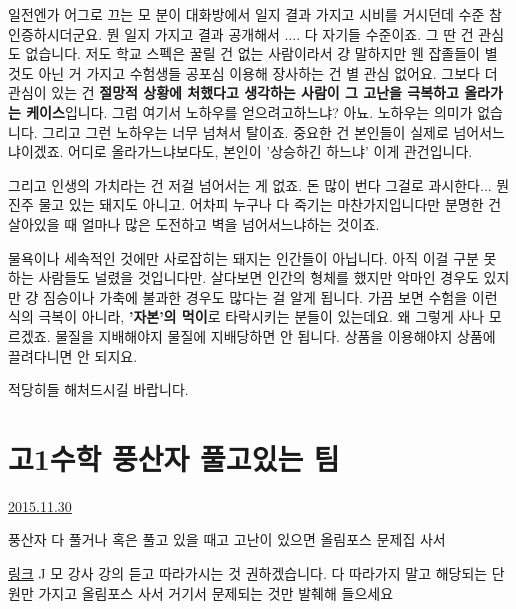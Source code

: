 일전엔가 어그로 끄는 모 분이 대화방에서 일지 결과 가지고 시비를 거시던데 수준 참 인증하시더군요.
뭔 일지 가지고 결과 공개해서 .... 다 자기들 수준이죠. 그 딴 건 관심도 없습니다.
저도 학교 스펙은 꿀릴 건 없는 사람이라서 걍 말하지만 웬 잡졸들이 별 것도 아닌 거 가지고 수험생들 공포심 이용해 장사하는 건 별 관심 없어요.
그보다 더 관심이 있는 건 \textbf{절망적 상황에 처했다고 생각하는 사람이 그 고난을 극복하고 올라가는 케이스}입니다.
그럼 여기서 노하우를 얻으려고하느냐? 아뇨. 노하우는 의미가 없습니다. 그리고 그런 노하우는 너무 넘쳐서 탈이죠.
중요한 건 본인들이 실제로 넘어서느냐이겠죠. 어디로 올라가느냐보다도, 본인이 '상승하긴 하느냐' 이게 관건입니다.
\vspace{5mm}

그리고 인생의 가치라는 건 저걸 넘어서는 게 없죠.
돈 많이 번다 그걸로 과시한다... 뭔 진주 물고 있는 돼지도 아니고.
어차피 누구나 다 죽기는 마찬가지입니다만 분명한 건 살아있을 때 얼마나 많은 도전하고 벽을 넘어서느냐하는 것이죠.
\vspace{5mm}

물욕이나 세속적인 것에만 사로잡히는 돼지는 인간들이 아닙니다. 아직 이걸 구분 못 하는 사람들도 널렸을 것입니다만.
살다보면 인간의 형체를 했지만 악마인 경우도 있지만 걍 짐승이나 가축에 불과한 경우도 많다는 걸 알게 됩니다.
가끔 보면 수험을 이런 식의 극복이 아니라, \textbf{'자본'의 먹이}로 타락시키는 분들이 있는데요.
왜 그렇게 사나 모르겠죠.
물질을 지배해야지 물질에 지배당하면 안 됩니다.
상품을 이용해야지 상품에 끌려다니면 안 되지요.
\vspace{5mm}

적당히들 해처드시길 바랍니다.
\vspace{5mm}






\section{고1수학 풍산자 풀고있는 팀}
\href{https://www.kockoc.com/Apoc/518860}{2015.11.30}

\vspace{5mm}

풍산자 다 풀거나 혹은 풀고 있을 때고 고난이 있으면
올림포스 문제집 사서
\vspace{5mm}

\href{http://ebsi.co.kr/ebs/lms/lmsx/retrieveSbjtDtl.ebs?sbjtId=S20140000145&Clickz=C101}{링크}
J 모 강사 강의 듣고 따라가시는 것 권하겠습니다.
다 따라가지 말고 해당되는 단원만 가지고 올림포스 사서 거기서 문제되는 것만 발췌해 들으세요
\vspace{5mm}

